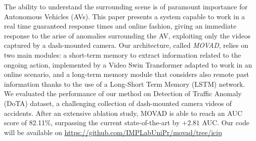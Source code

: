 The ability to understand the surrounding scene is of paramount importance for Autonomous Vehicles (AVs).
This paper presents a system capable to work in a real time guaranteed response times and online fashion, giving an immediate response to the arise of anomalies surrounding the AV, exploiting only the videos captured by a dash-mounted camera.
Our architecture, called \emph{MOVAD}, relies on two main modules: a short-term memory to extract information related to the ongoing action, implemented by a Video Swin Transformer adapted to work in an online scenario, and a long-term memory module that considers also remote past information thanks to the use of a Long-Short Term Memory (LSTM) network.
We evaluated the performance of our method on Detection of Traffic Anomaly (DoTA) dataset, a challenging collection of dash-mounted camera videos of accidents.
After an extensive ablation study, MOVAD is able to reach an AUC score of 82.11\%, surpassing the current state-of-the-art by $+2.81$ AUC.
Our code will be available on {\footnotesize \url{https://github.com/IMPLabUniPr/movad/tree/icip}}